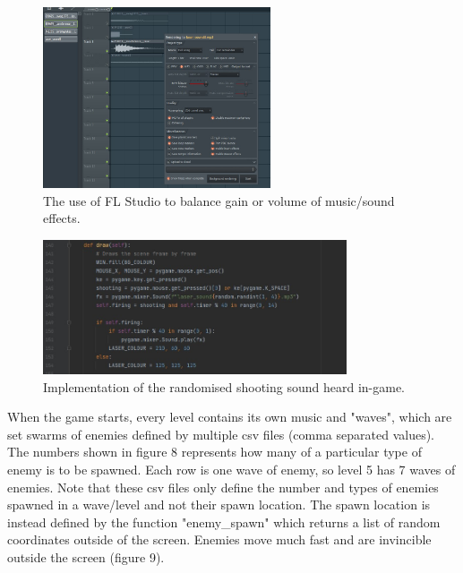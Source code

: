 \documentclass[a4paper, 11pt]{report}
\begin{document}
\begin{figure}[h]
    \centering
    \includegraphics[width=0.6\textwidth]{flstudio}
    \caption{The use of FL Studio to balance gain or volume of music/sound effects.}
\end{figure}
\begin{figure}[h]
    \centering
    \includegraphics[width=0.8\textwidth]{shootingsound}
    \caption{Implementation of the randomised shooting sound heard in-game.}
\end{figure}
When the game starts, every level contains its own music and "waves", which are set swarms of enemies defined by multiple csv files (comma separated values). The numbers shown in figure 8 represents how many of a particular type of enemy is to be spawned. Each row is one wave of enemy, so level 5 has 7 waves of enemies. Note that these csv files only define the number and types of enemies spawned in a wave/level and not their spawn location.
The spawn location is instead defined by the function "enemy\_spawn" which returns a list of random coordinates outside of the screen. Enemies move much fast and are invincible outside the screen (figure 9).
\\\\\\\\\\\\\\\\\\\\\\\\
\end{document}
